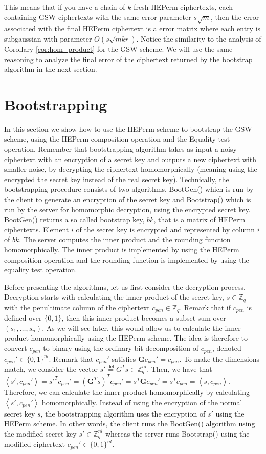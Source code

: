This means that if you have a chain of $k$ fresh HEPerm ciphertexts, each containing GSW ciphertexts with the same error parameter $s\sqrt{m}$, then the error associated with the final HEPerm ciphertext is a error matrix where each entry is subgaussian with parameter $O(s\sqrt{mkr})$. Notice the similarity to the analysis of Corollary \ref{cor:hom_product} for the GSW scheme. We will use the same reasoning to analyze the final error of the ciphertext returned by the bootstrap algorithm in the next section.

\section{Bootstrapping}
In this section we show how to use the HEPerm scheme to bootstrap the GSW scheme, using the HEPerm composition operation and the Equality test operation. Remember that bootstrapping algorithm takes as input a noisy ciphertext with an encryption of a secret key and outputs a new ciphertext with smaller noise, by decrypting the ciphertext homomorphically (meaning using the encrypted the secret key instead of the real secret key). Technically, the bootstrapping procedure consists of two algorithms, BootGen() which is run by the client to generate an encryption of the secret key and Bootstrap() which is run by the server for homomorphic decryption, using the encrypted secret key. BootGen() returns a so called bootstrap key, $bk$, that is a matrix of HEPerm ciphertexts. Element $i$ of the secret key is encrypted and represented by column $i$ of $bk$. The server computes the inner product and the rounding function homomorphically. The inner product is implemented by using the HEPerm composition operation and the rounding function is implemented by using the equality test operation.

Before presenting the algorithms, let us first consider the decryption process. Decryption starts with calculating the inner product of the secret key, $s \in \mathbb{Z}_q$ with the penultimate column of the ciphertext $c_{pen} \in \mathbb{Z}_q$. Remark that if $c_{pen}$ is defined over $\{0,1\}$, then this inner product becomes a subset sum over $(s_1, \dots, s_n)$. As we will see later, this would allow us to calculate the inner product homomorphically using the HEPerm scheme. The idea is therefore to convert $c_{pen}$ to binary using the ordinary bit decomposition of $c_{pen}$, denoted $c_{pen}' \in \{0,1\}^{nl}$. Remark that $c_{pen}'$ satisfies $\mathbf{G}c_{pen}' = c_{pen}$. To make the dimensions match, we consider the vector $s' \stackrel{\mathrm{def}}{=} G^T s \in \mathbb{Z}_q^{nl}$. Then, we have that $\left \langle s', c_{pen}' \right \rangle = s'^T c_{pen}' = (\mathbf{G}^T s)^T c_{pen}' = s^T \mathbf{G} c_{pen}' = s^T c_{pen} = \left \langle s,c_{pen} \right \rangle$. Therefore, we can calculate the inner product homomorphically by calculating $\left \langle s', c_{pen}' \right \rangle$ homomorphically. Instead of using the encryption of the normal secret key $s$, the bootstrapping algorithm uses the encryption of $s'$ using the HEPerm scheme. In other words, the client runs the BootGen() algorithm using the modified secret key $s' \in \mathbb{Z}_q^{nl}$ whereas the server runs Bootstrap() using the modified ciphertext $c_{pen}' \in \{0,1\}^{nl}$.

